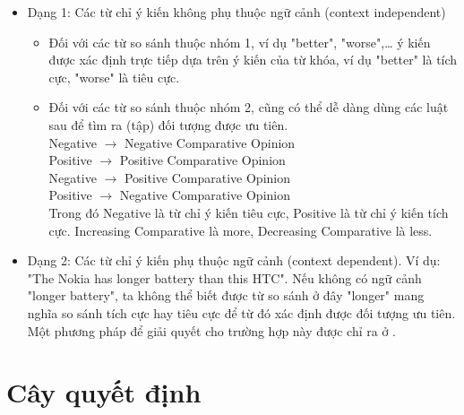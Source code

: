 \documentclass[12pt]{report}
\begin{document}
				\begin{itemize}
				\item{Dạng 1: Các từ chỉ ý kiến không phụ thuộc ngữ cảnh (context independent)
					\begin{itemize}
						\item{Đối với các từ so sánh thuộc nhóm 1, ví dụ "better", "worse",… ý kiến được xác định trực tiếp dựa trên ý kiến của từ khóa, ví dụ "better" là tích cực, "worse" là tiêu cực.}
						\item{Đối với các từ so sánh thuộc nhóm 2, cũng có thể dễ dàng dùng các luật sau để tìm ra (tập) đối tượng được ưu tiên.				
							\\<Increasing Comparative> Negative $\rightarrow$ Negative Comparative Opinion
							\\<Increasing Comparative> Positive $\rightarrow$ Positive Comparative Opinion
							\\<Decreasing Comparative> Negative $\rightarrow$ Positive Comparative Opinion
							\\<Decreasing Comparative> Positive $\rightarrow$ Negative Comparative Opinion
							\\Trong đó Negative là từ chỉ ý kiến tiêu cực, Positive là từ chỉ ý kiến tích cực. Increasing Comparative là more, Decreasing Comparative là less.}
					\end{itemize}}
				\item{Dạng 2: Các từ chỉ ý kiến phụ thuộc ngữ cảnh (context dependent). Ví dụ: "The Nokia has longer battery than this HTC". Nếu không có ngữ cảnh "longer battery", ta không thể biết được từ so sánh ở đây "longer" mang nghĩa so sánh tích cực hay tiêu cực để từ đó xác định được đối tượng ưu tiên. Một phương pháp để giải quyết cho trường hợp này được chỉ ra ở \cite{comparative2}.}
				\end{itemize}
		\section{Cây quyết định}
\end{document}
